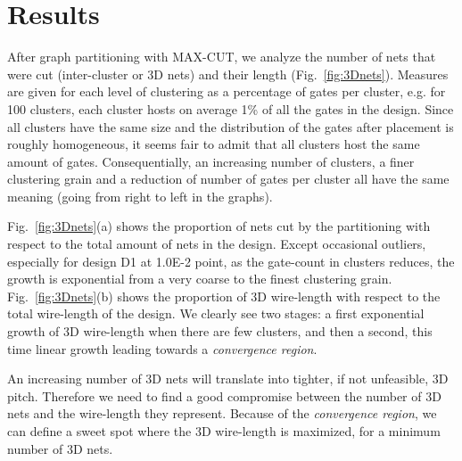 \documentclass[conference]{IEEEtran}
\begin{document}
\section{Results}\label{sec:res}
After graph partitioning with MAX-CUT, we analyze the number of nets that were cut (inter-cluster or 3D nets) and their length (Fig.~\ref{fig:3Dnets}). Measures are given for each level of clustering as a percentage of gates per cluster, e.g. for 100 clusters, each cluster hosts on average 1\% of all the gates in the design. Since all clusters have the same size and the distribution of the gates after placement is roughly homogeneous, it seems fair to admit that all clusters host the same amount of gates. Consequentially, an increasing number of clusters, a finer clustering grain and a reduction of number of gates per cluster all have the same meaning (going from right to left in the graphs).

Fig.~\ref{fig:3Dnets}(a) shows the proportion of nets cut by the partitioning with respect to the total amount of nets in the design. Except occasional outliers, especially for design D1 at 1.0E-2 point, as the gate-count in clusters reduces, the growth is exponential from a very coarse to the finest clustering grain. Fig.~\ref{fig:3Dnets}(b) shows the proportion of 3D wire-length with respect to the total wire-length of the design. We clearly see two stages: a first exponential growth of 3D wire-length when there are few clusters, and then a second, this time linear growth leading towards a \textit{convergence region}.

An increasing number of 3D nets will translate into tighter, if not unfeasible, 3D pitch. Therefore we need to find a good compromise between the number of 3D nets and the wire-length they represent. Because of the \textit{convergence region}, we can define a sweet spot where the 3D wire-length is maximized, for a minimum number of 3D nets.
\end{document}
